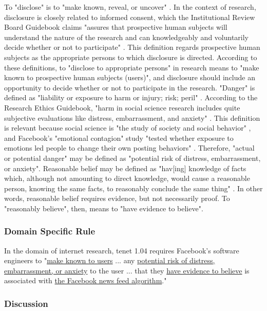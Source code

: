 	To "disclose" is to "make known, reveal, or uncover" \cite{define-disclose}.  In the context of research, disclosure is closely related to informed consent, which the Institutional Review Board Guidebook claims "assures that prospective human subjects will understand the nature of the research and can knowledgeably and voluntarily decide whether or not to participate" \cite{irb-informed-consent}.  This definition regards prospective human subjects as the appropriate persons to which disclosure is directed.  According to these definitions, to "disclose to appropriate persons" in research means to "make known to prospective human subjects (users)", and disclosure should include an opportunity to decide whether or not to participate in the research.
	"Danger" is defined as "liability or exposure to harm or injury; risk; peril" \cite{define-danger}.  According to the Research Ethics Guidebook, "harm in social science research includes quite subjective evaluations like distress, embarrassment, and anxiety" \cite{define-harm}.  This definition is relevant because social science is "the study of society and social behavior" \cite{define-social-science}, and Facebook's "emotional contagion" study "tested whether exposure to emotions led people to change their own posting behaviors" \cite{study}.  Therefore, "actual or potential danger" may be defined as "potential risk of distress, embarrassment, or anxiety".
	Reasonable belief may be defined as "hav[ing] knowledge of facts which, although not amounting to direct knowledge, would cause a reasonable person, knowing the same facts, to reasonably conclude the same thing" \cite{define-reasonable-belief}.  In other words, reasonable belief requires evidence, but not necessarily proof.  To "reasonably believe", then, means to "have evidence to believe".

	\subsubsection{Domain Specific Rule}
	In the domain of internet research, tenet 1.04 requires Facebook's software engineers to "\uline{make known to users} ... any \uline{potential risk of distress, embarrassment, or anxiety} to the user ... that they \uline{have evidence to believe} is associated with \uline{the Facebook news feed algorithm}."

	\subsubsection{Discussion}

